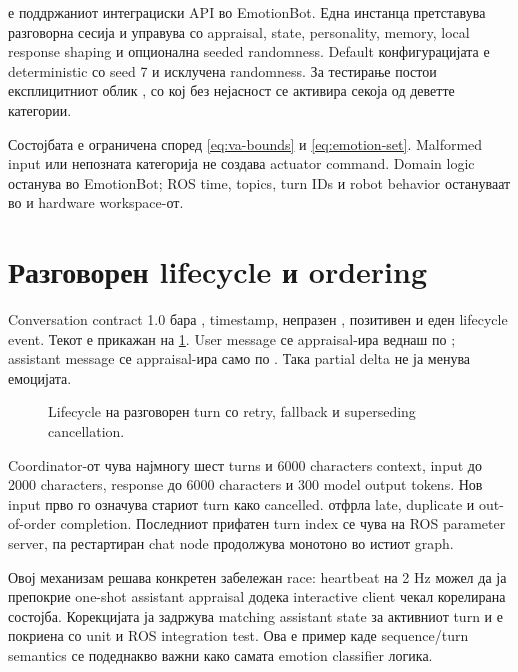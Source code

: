  е поддржаниот интеграциски API во EmotionBot. Една
инстанца претставува разговорна сесија и управува со appraisal, state,
personality, memory, local response shaping и опционална seeded randomness.
Default конфигурацијата е deterministic со seed 7 и исклучена randomness.
За тестирање постои експлицитниот облик , со кој без
нејасност се активира секоја од деветте категории.

Состојбата е ограничена според \cref{eq:va-bounds} и \cref{eq:emotion-set}.
Malformed input или непозната категорија не создава actuator command. Domain
logic останува во EmotionBot; ROS time, topics, turn IDs и robot behavior
остануваат во  и hardware workspace-от.

\section{Разговорен lifecycle и ordering}

Conversation contract 1.0 бара , timestamp, непразен
, позитивен  и еден lifecycle event. Текот е
прикажан на \cref{fig:conversation-lifecycle}. User message се appraisal-ира
веднаш по ; assistant message се appraisal-ира само по
. Така partial delta не ја менува емоцијата.

\begin{figure}[htbp]
\centering
\resizebox{\textwidth}{!}{}
\caption{Lifecycle на разговорен turn со retry, fallback и superseding cancellation.}
\label{fig:conversation-lifecycle}
\end{figure}

Coordinator-от чува најмногу шест turns и 6000 characters context, input до
2000 characters, response до 6000 characters и 300 model output tokens. Нов
input прво го означува стариот turn како cancelled.  отфрла
late, duplicate и out-of-order completion. Последниот прифатен turn index се
чува на ROS parameter server, па рестартиран chat node продолжува монотоно во
истиот graph.

Овој механизам решава конкретен забележан race: heartbeat на 2 Hz можел да ја
препокрие one-shot assistant appraisal додека interactive client чекал
корелирана состојба. Корекцијата ја задржува matching assistant state за
активниот turn и е покриена со unit и ROS integration test. Ова е пример каде
sequence/turn semantics се подеднакво важни како самата emotion classifier
логика.


